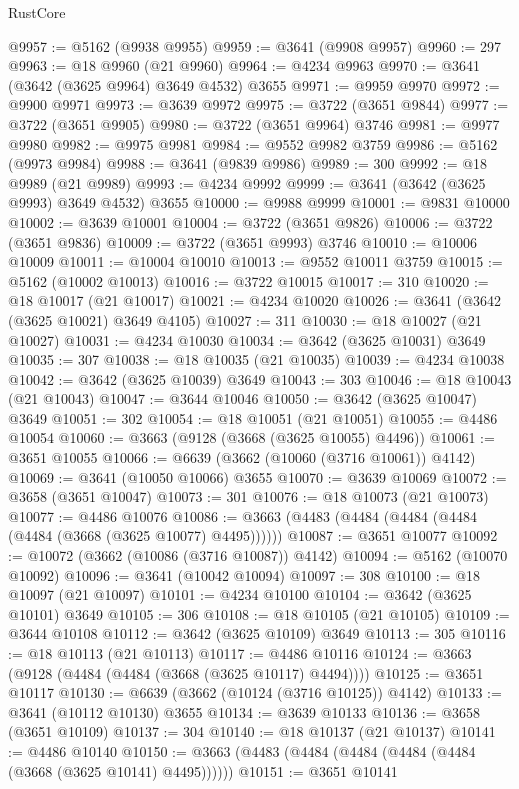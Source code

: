 \begin{lexlean}{RustCore}
\begin{coremodule}
@9957 := @5162 (@9938 @9955)
@9959 := @3641 (@9908 @9957)
@9960 := 297
@9963 := @18 @9960 (@21 @9960)
@9964 := @4234 @9963
@9970 := @3641 (@3642 (@3625 @9964) @3649 @4532) @3655
@9971 := @9959 @9970
@9972 := @9900 @9971
@9973 := @3639 @9972
@9975 := @3722 (@3651 @9844)
@9977 := @3722 (@3651 @9905)
@9980 := @3722 (@3651 @9964) @3746
@9981 := @9977 @9980
@9982 := @9975 @9981
@9984 := @9552 @9982 @3759
@9986 := @5162 (@9973 @9984)
@9988 := @3641 (@9839 @9986)
@9989 := 300
@9992 := @18 @9989 (@21 @9989)
@9993 := @4234 @9992
@9999 := @3641 (@3642 (@3625 @9993) @3649 @4532) @3655
@10000 := @9988 @9999
@10001 := @9831 @10000
@10002 := @3639 @10001
@10004 := @3722 (@3651 @9826)
@10006 := @3722 (@3651 @9836)
@10009 := @3722 (@3651 @9993) @3746
@10010 := @10006 @10009
@10011 := @10004 @10010
@10013 := @9552 @10011 @3759
@10015 := @5162 (@10002 @10013)
@10016 := @3722 @10015
@10017 := 310
@10020 := @18 @10017 (@21 @10017)
@10021 := @4234 @10020
@10026 := @3641 (@3642 (@3625 @10021) @3649 @4105)
@10027 := 311
@10030 := @18 @10027 (@21 @10027)
@10031 := @4234 @10030
@10034 := @3642 (@3625 @10031) @3649
@10035 := 307
@10038 := @18 @10035 (@21 @10035)
@10039 := @4234 @10038
@10042 := @3642 (@3625 @10039) @3649
@10043 := 303
@10046 := @18 @10043 (@21 @10043)
@10047 := @3644 @10046
@10050 := @3642 (@3625 @10047) @3649
@10051 := 302
@10054 := @18 @10051 (@21 @10051)
@10055 := @4486 @10054
@10060 := @3663 (@9128 (@3668 (@3625 @10055) @4496))
@10061 := @3651 @10055
@10066 := @6639 (@3662 (@10060 (@3716 @10061)) @4142)
@10069 := @3641 (@10050 @10066) @3655
@10070 := @3639 @10069
@10072 := @3658 (@3651 @10047)
@10073 := 301
@10076 := @18 @10073 (@21 @10073)
@10077 := @4486 @10076
@10086 := @3663 (@4483 (@4484 (@4484 (@4484 (@4484 (@3668 (@3625 @10077) @4495))))))
@10087 := @3651 @10077
@10092 := @10072 (@3662 (@10086 (@3716 @10087)) @4142)
@10094 := @5162 (@10070 @10092)
@10096 := @3641 (@10042 @10094)
@10097 := 308
@10100 := @18 @10097 (@21 @10097)
@10101 := @4234 @10100
@10104 := @3642 (@3625 @10101) @3649
@10105 := 306
@10108 := @18 @10105 (@21 @10105)
@10109 := @3644 @10108
@10112 := @3642 (@3625 @10109) @3649
@10113 := 305
@10116 := @18 @10113 (@21 @10113)
@10117 := @4486 @10116
@10124 := @3663 (@9128 (@4484 (@4484 (@3668 (@3625 @10117) @4494))))
@10125 := @3651 @10117
@10130 := @6639 (@3662 (@10124 (@3716 @10125)) @4142)
@10133 := @3641 (@10112 @10130) @3655
@10134 := @3639 @10133
@10136 := @3658 (@3651 @10109)
@10137 := 304
@10140 := @18 @10137 (@21 @10137)
@10141 := @4486 @10140
@10150 := @3663 (@4483 (@4484 (@4484 (@4484 (@4484 (@3668 (@3625 @10141) @4495))))))
@10151 := @3651 @10141

\end{coremodule}
\end{lexlean}
